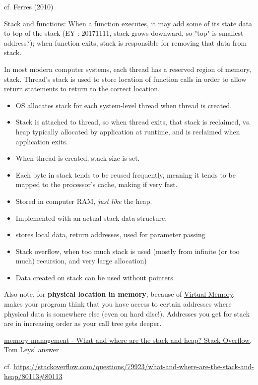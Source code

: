 \documentclass[10pt]{amsart}
\begin{document}
\begin{multicols*}{2}
cf. Ferres (2010) \cite{Ferr2010}

Stack and functions: When a function executes, it may add some of its state data to top of the stack (EY : 20171111, stack grows downward, so "top" is smallest address?); when function exits, stack is responsible for removing that data from stack.  

In most modern computer systems, each thread has a reserved region of memory, stack.  Thread's stack is used to store location of function calls in order to allow return statements to return to the correct location.  

\begin{itemize}
	\item OS allocates stack for each system-level thread when thread is created.  
	\item Stack is attached to thread, so when thread exits, that stack is reclaimed, vs. heap typically allocated by application at runtime, and is reclaimed when application exits.  
	\item When thread is created, stack size is set.  
	\item Each byte in stack tends to be reused frequently, meaning it tends to be mapped to the processor's cache, making if very fast.  
	\item Stored in computer RAM, \emph{just like} the heap.  
	\item Implemented with an actual stack data structure.  
	\item stores local data, return addresses, used for parameter passing  
	\item Stack overflow, when too much stack is used (mostly from infinite (or too much) recursion, and very large allocation)
	\item Data created on stack can be used without pointers.  
\end{itemize}

Also note, for \textbf{physical location in memory}, because of \href{http://en.wikipedia.org/wiki/Virtual_memory}{Virtual Memory}, makes your program think that you have access to certain addresses where physical data is somewhere else (even on hard disc!).  Addresses you get for stack are in increasing order as your call tree gets deeper.  

\href{http://stackoverflow.com/questions/79923/what-and-where-are-the-stack-and-heap/79988#79988}{memory management - What and where are the stack and heap? Stack Overflow, Tom Leys' answer}

cf. \url{https://stackoverflow.com/questions/79923/what-and-where-are-the-stack-and-heap/80113#80113}  


\end{multicols*}
\end{document}
